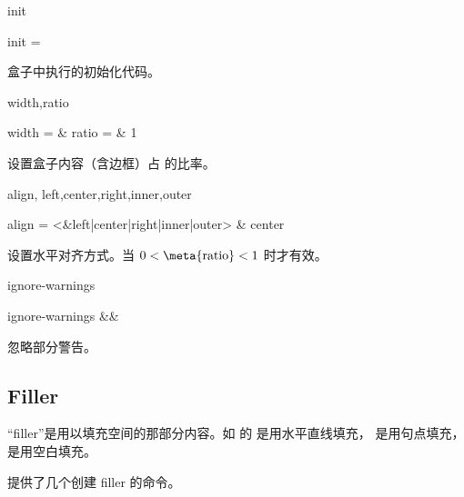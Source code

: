 \documentclass{cusdoc}
\begin{document}
\begin{keyval}[path=frame]{init}
  \begin{syntax}
    init = 
  \end{syntax}
盒子中执行的初始化代码。
\end{keyval}

\begin{keyval}[path=frame]{width,ratio}
  \begin{syntax}
    width =  & \V\textwidth
    ratio =  & 1
  \end{syntax}
 设置盒子内容（含边框）占  的比率。
\end{keyval}

\begin{keyval}[path=frame]{align,
  left,center,right,inner,outer}
  \begin{syntax}
    align = <&left|center|right|inner|outer> & center 
  \end{syntax}
设置水平对齐方式。当 $ 0 <{} \text{\meta{ratio}} {}< 1 $ 时才有效。
\end{keyval}

\begin{xample}
\begin{Framed}[ratio=.8,center,
  rule-width=2pt,
  frame={\setlength{\fboxsep}{\cusframesep}%
          \setlength{\fboxrule}{\cusframerule}%
          \fcolorbox{purple}{cyan!50}}]
\zhlipsum[9][name=zhufu]
\end{Framed}
\stopxamplecode
\xampleprint 
\vskip 1pt 
\end{xample}

\begin{keyval}[path=frame]{ignore-warnings}
  \begin{syntax}
    ignore-warnings &&
  \end{syntax}
忽略部分警告。
\end{keyval}


\subsection{Filler}

“filler”是用以填充空间的那部分内容。如 \LaTeXe 的  是用水平直线填充，
 是用句点填充， 是用空白填充。

 提供了几个创建 filler 的命令。
\end{document}
